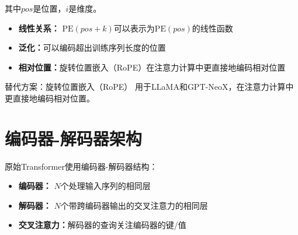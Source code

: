 其中$pos$是位置，$i$是维度。

\begin{properties}[位置编码特性]
\begin{itemize}
    \item \textbf{线性关系：} $\text{PE}(pos+k)$可以表示为$\text{PE}(pos)$的线性函数
    \item \textbf{泛化：}可以编码超出训练序列长度的位置
    \item \textbf{相对位置：}旋转位置嵌入（RoPE）在注意力计算中更直接地编码相对位置
\end{itemize}
\end{properties}

替代方案：旋转位置嵌入（RoPE） \cite{su2021roformer}用于LLaMA和GPT-NeoX，在注意力计算中更直接地编码相对位置。

\section{编码器-解码器架构}

原始Transformer使用编码器-解码器结构：

\begin{itemize}
    \item \textbf{编码器：} $N$个处理输入序列的相同层
    \item \textbf{解码器：} $N$个带跨编码器输出的交叉注意力的相同层
    \item \textbf{交叉注意力：}解码器的查询关注编码器的键/值
\end{itemize}

